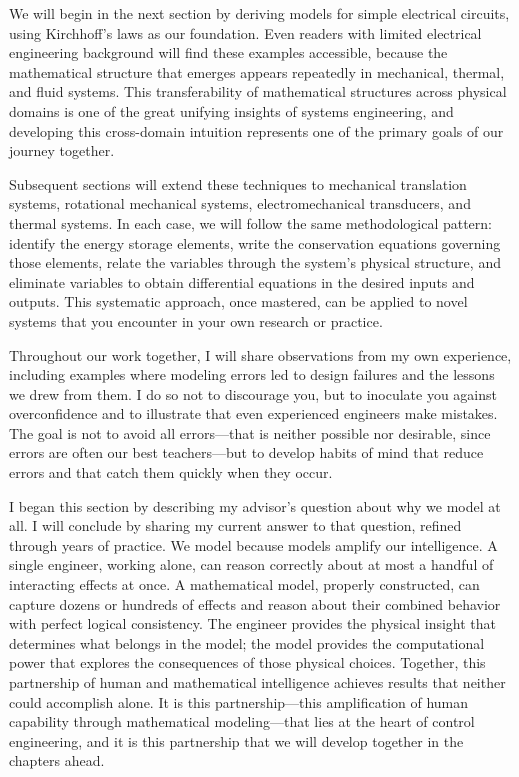 We will begin in the next section by deriving models for simple electrical circuits, using Kirchhoff's laws as our foundation. Even readers with limited electrical engineering background will find these examples accessible, because the mathematical structure that emerges appears repeatedly in mechanical, thermal, and fluid systems. This transferability of mathematical structures across physical domains is one of the great unifying insights of systems engineering, and developing this cross-domain intuition represents one of the primary goals of our journey together.

Subsequent sections will extend these techniques to mechanical translation systems, rotational mechanical systems, electromechanical transducers, and thermal systems. In each case, we will follow the same methodological pattern: identify the energy storage elements, write the conservation equations governing those elements, relate the variables through the system's physical structure, and eliminate variables to obtain differential equations in the desired inputs and outputs. This systematic approach, once mastered, can be applied to novel systems that you encounter in your own research or practice.

Throughout our work together, I will share observations from my own experience, including examples where modeling errors led to design failures and the lessons we drew from them. I do so not to discourage you, but to inoculate you against overconfidence and to illustrate that even experienced engineers make mistakes. The goal is not to avoid all errors---that is neither possible nor desirable, since errors are often our best teachers---but to develop habits of mind that reduce errors and that catch them quickly when they occur.

I began this section by describing my advisor's question about why we model at all. I will conclude by sharing my current answer to that question, refined through years of practice. We model because models amplify our intelligence. A single engineer, working alone, can reason correctly about at most a handful of interacting effects at once. A mathematical model, properly constructed, can capture dozens or hundreds of effects and reason about their combined behavior with perfect logical consistency. The engineer provides the physical insight that determines what belongs in the model; the model provides the computational power that explores the consequences of those physical choices. Together, this partnership of human and mathematical intelligence achieves results that neither could accomplish alone. It is this partnership---this amplification of human capability through mathematical modeling---that lies at the heart of control engineering, and it is this partnership that we will develop together in the chapters ahead.
